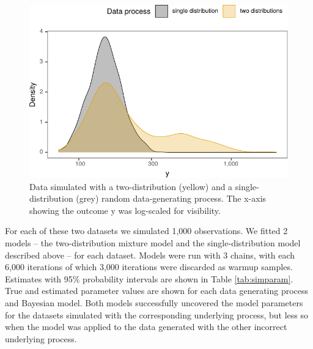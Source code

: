 \documentclass[
  man,floatsintext]{apa7}
\begin{document}
\begin{figure}

{\centering \includegraphics{manuscript_files/figure-latex/simdata-1} 

}

\caption{Data simulated with a two-distribution (yellow) and a single-distribution (grey) random data-generating process. The x-axis showing the outcome y was log-scaled for visibility.}\label{fig:simdata}
\end{figure}

For each of these two datasets we simulated 1,000 observations. We fitted 2 models -- the two-distribution mixture model and the single-distribution model described above -- for each dataset. Models were run with 3 chains, with each 6,000 iterations of which 3,000 iterations were discarded as warmup samples. Estimates with 95\% probability intervals are shown in Table \ref{tab:simparam}. True and estimated parameter values are shown for each data generating process and Bayesian model. Both models successfully uncovered the model parameters for the datasets simulated with the corresponding underlying process, but less so when the model was applied to the data generated with the other incorrect underlying process.
\end{document}
